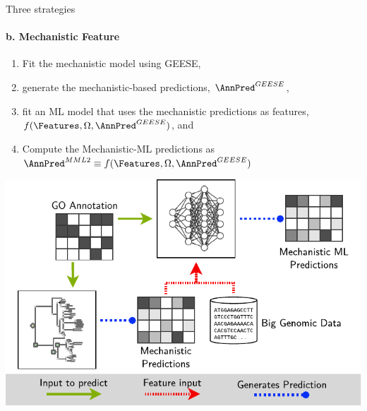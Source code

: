 \documentclass[10pt,aspectratio=169]{beamer}
\newcounter{frame}[frame]
\begin{document}
\begin{frame}{Three strategies}
	\framesubtitle{b. Mechanistic Feature}
	\begin{minipage}[b]{.4\linewidth}
		\begin{enumerate}[<+->]
		\item Fit the mechanistic model using GEESE, 
		\item generate the mechanistic-based predictions, $\AnnPred^{GEESE}$, 
		\item fit an ML model that uses the mechanistic predictions as features, $f(\Features, \Omega, \AnnPred^{GEESE})$, and 
		\item Compute the Mechanistic-ML predictions as $\AnnPred^{MML2} \equiv f(\Features, \Omega, \AnnPred^{GEESE})$
		\end{enumerate}
	\end{minipage}\hfill
	\begin{minipage}[b]{.55\linewidth}
		\includegraphics[width=1\linewidth]{fig/mech-ml-model-b.pdf}
	\end{minipage}
\end{frame}
\end{document}
